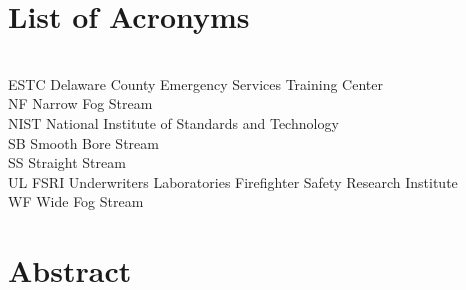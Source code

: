 \documentclass[12pt,oneside]{book}
\begin{document}
\cleardoublepage
{}
{}
\tableofcontents

\cleardoublepage
{}
{}
\listoffigures

\cleardoublepage
{}
{}
\listoftables

\chapter{List of Acronyms}

\begin{tabbing}
\hspace{1.5in} \= \\
ESTC \> Delaware County Emergency Services Training Center \\
NF \> Narrow Fog Stream\\
NIST \> National Institute of Standards and Technology \\
SB \> Smooth Bore Stream\\
SS \> Straight Stream \\
UL FSRI \> Underwriters Laboratories Firefighter Safety Research Institute \\
WF \> Wide Fog Stream \\
\end{tabbing}

\newpage 

\mainmatter


\chapter*{\centering Abstract}
\end{document}

